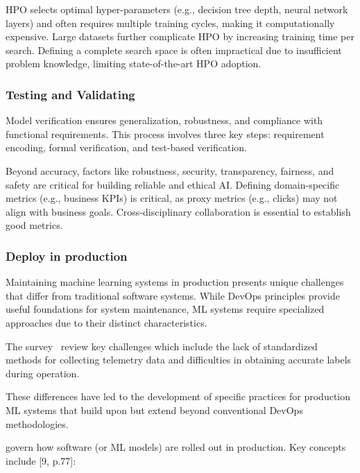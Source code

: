 HPO selects optimal hyper-parameters (e.g., decision tree depth, neural network layers) and often requires multiple training cycles, making it computationally expensive.
Large datasets further complicate HPO by increasing training time per search\cite{10.1145/3533378}.
Defining a complete search space is often impractical due to insufficient problem knowledge, limiting state-of-the-art HPO adoption.

\subsubsection{Testing and Validating}
Model verification ensures generalization, robustness, and compliance with functional requirements.
This process involves three key steps: requirement encoding, formal verification, and test-based verification\cite{10.1145/3533378}.

Beyond accuracy, factors like robustness, security, transparency, fairness, and safety are critical for building reliable and ethical AI\cite{10.1145/3555803}.
Defining domain-specific metrics (e.g., business KPIs) is critical, as proxy metrics (e.g., clicks) may not align with business goals\cite{10.1145/3533378}.
Cross-disciplinary collaboration is essential to establish good metrics.

\subsubsection{Deploy in production}
Maintaining machine learning systems in production presents unique challenges that differ from traditional software systems.
While DevOps principles provide useful foundations for system maintenance, ML systems require specialized approaches due to their distinct characteristics\cite{10.1145/3533378}.

The survey~\cite{10.1145/3533378} review key challenges which include the lack of standardized methods for collecting telemetry data and difficulties in obtaining accurate labels during operation.

These differences have led to the development of specific practices for production ML systems that build upon but extend beyond conventional DevOps methodologies\cite{gift2021practical,10.1145/3533378}.


\label{subsec:deployment-strategies}
govern how software (or ML models) are rolled out in production.
Key concepts include [9, p.77]:

